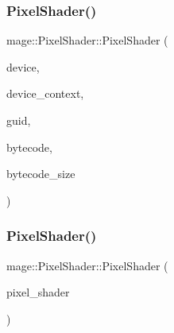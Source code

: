 \hypertarget{classmage_1_1_pixel_shader_a0278c67883cbf9259ea83e7f6c8162a2}{}\label{classmage_1_1_pixel_shader_a0278c67883cbf9259ea83e7f6c8162a2} 
\subsubsection{\texorpdfstring{Pixel\+Shader()}{PixelShader()}\hspace{0.1cm}{\footnotesize\ttfamily [2/4]}}
{\footnotesize\ttfamily mage\+::\+Pixel\+Shader\+::\+Pixel\+Shader (\begin{DoxyParamCaption}\item[{I\+D3\+D11\+Device2 $\ast$}]{device,  }\item[{I\+D3\+D11\+Device\+Context2 $\ast$}]{device\+\_\+context,  }\item[{const wstring \&}]{guid,  }\item[{const void $\ast$}]{bytecode,  }\item[{S\+I\+Z\+E\+\_\+T}]{bytecode\+\_\+size }\end{DoxyParamCaption})\hspace{0.3cm}{\ttfamily [explicit]}}

\hypertarget{classmage_1_1_pixel_shader_a361df943e40e9015ac4b769af130ce79}{}\label{classmage_1_1_pixel_shader_a361df943e40e9015ac4b769af130ce79} 
\subsubsection{\texorpdfstring{Pixel\+Shader()}{PixelShader()}\hspace{0.1cm}{\footnotesize\ttfamily [3/4]}}
{\footnotesize\ttfamily mage\+::\+Pixel\+Shader\+::\+Pixel\+Shader (\begin{DoxyParamCaption}\item[{const \hyperlink{classmage_1_1_pixel_shader}{Pixel\+Shader} \&}]{pixel\+\_\+shader }\end{DoxyParamCaption})\hspace{0.3cm}{\ttfamily [delete]}}

\hypertarget{classmage_1_1_pixel_shader_a5adc11fbc9b644b38cb9f6e5c7974a90}{}\label{classmage_1_1_pixel_shader_a5adc11fbc9b644b38cb9f6e5c7974a90} 
